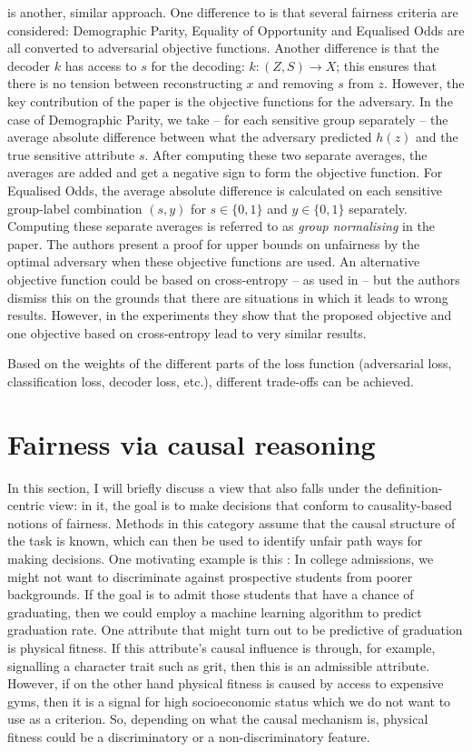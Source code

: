 \citet{madras2018learning} is another, similar approach.
One difference to \citet{edwards2016censoring} is that several fairness criteria are considered:
Demographic Parity, Equality of Opportunity and Equalised Odds are all converted to adversarial objective functions.
Another difference is that the decoder \(k\) has access to \(s\) for the decoding: \(k: (Z, S)\to X\);
this ensures that there is no tension between reconstructing \(x\) and removing \(s\) from \(z\).
However, the key contribution of the paper is the objective functions for the adversary.
In the case of Demographic Parity, we take -- for each sensitive group separately --
the average absolute difference between what the adversary predicted \(h(z)\) and the true sensitive attribute \(s\).
After computing these two separate averages,
the averages are added and get a negative sign to form the objective function.
For Equalised Odds,
the average absolute difference is calculated on each sensitive group-label combination
\((s, y)\) for \(s \in \{0, 1\}\) and \(y \in \{0, 1\}\) separately.
Computing these separate averages is referred to as \emph{group normalising} in the paper.
The authors present a proof for upper bounds on unfairness by the optimal adversary
when these objective functions are used.
An alternative objective function could be based on cross-entropy -- as used in \citet{edwards2016censoring} --
but the authors dismiss this on the grounds that there are situations in which it leads to wrong results.
However, in the experiments they show
that the proposed objective and one objective based on cross-entropy lead to very similar results.

Based on the weights of the different parts of the loss function
(adversarial loss, classification loss, decoder loss, etc.),
different trade-offs can be achieved.

\section{Fairness via causal reasoning}%
\label{sec:fairness-definition-based-on-causal-reasoning}
In this section, I will briefly discuss a view that also falls under the definition-centric view:
in it, the goal is to make decisions that conform to causality-based notions of fairness.
Methods in this category assume that the causal structure of the task is known,
which can then be used to identify unfair path ways for making decisions.
One motivating example is this \citep{dedeo2014wrong}:
In college admissions, we might not want to discriminate against prospective students from poorer backgrounds.
If the goal is to admit those students that have a chance of graduating,
then we could employ a machine learning algorithm to predict graduation rate.
One attribute that might turn out to be predictive of graduation is physical fitness.
If this attribute's causal influence is through,
for example, signalling a character trait such as grit,
then this is an admissible attribute.
However, if on the other hand physical fitness is caused by access to expensive gyms,
then it is a signal for high socioeconomic status which we do not want to use as a criterion.
So, depending on what the causal mechanism is,
physical fitness could be a discriminatory or a non-discriminatory feature.

